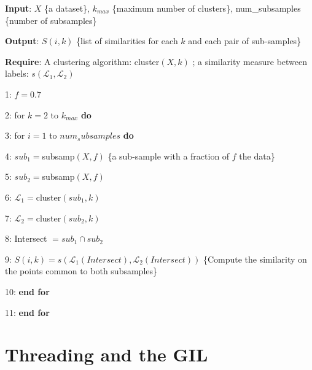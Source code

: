 \documentclass[a0paper,smallertitle]{HYposter}
\begin{document}
\begin{algorithm}[H] 
\textbf{Input}: $X$ \{a dataset\}, $k_{max}$ \{maximum number of
clusters\}, num\_subsamples \{number of subsamples\} 

\textbf{Output}: $S(i,k)$ \{list of similarities for each $k$ and
each pair of sub-samples\}

\textbf{Require}: A clustering algorithm: cluster$(X,k)$ ; a similarity
measure between labels: $s(\mathcal{L}_1,\mathcal{L}_2)$

1: $f = 0.7$ 

2: for $k=2$ to $k_{max}$ \textbf{do} 

3: for $i=1$ to $num_subsamples$ \textbf{do} 

4: $sub_1 = $subsamp$(X, f)$ \{a sub-sample with a fraction of $f$
the data\} 

5: $sub_2 = $subsamp$(X, f)$ 

6: $\mathcal{L}_1=$cluster$(sub_1, k)$ 

7: $\mathcal{L}_2=$cluster$(sub_2, k)$ 

8: Intersect $= sub_1 \cap sub_2$

9: $S(i, k) = s(\mathcal{L}_1(Intersect), \mathcal{L}_2(Intersect))$
\{Compute the similarity on the points common to both subsamples\} 

10: \textbf{end for }

11: \textbf{end for}

\caption{\label{alg:stability}}
\end{algorithm}



\section*{Threading and the GIL}

\end{document}
